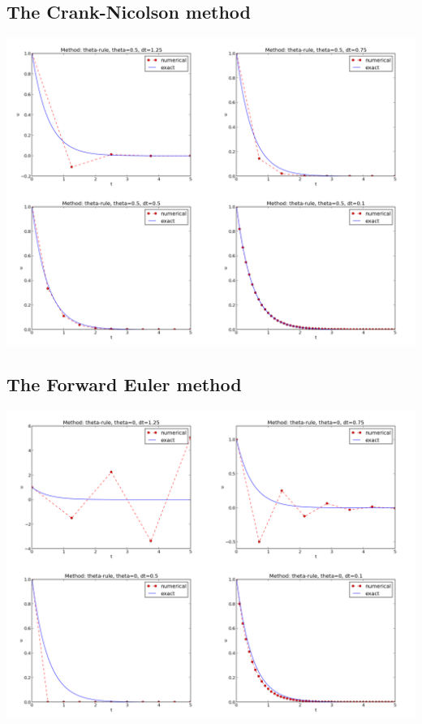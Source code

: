 \documentclass[twoside]{book}
\begin{document}

\subsection{The Crank-Nicolson method}



\begin{center}  %
  \centerline{\includegraphics[width=0.9\linewidth]{CN.png}}
\end{center}





\subsection{The Forward Euler method}



\begin{center}  %
  \centerline{\includegraphics[width=0.9\linewidth]{FE.png}}
\end{center}
\end{document}
